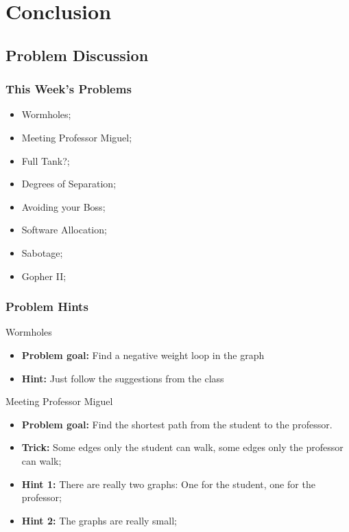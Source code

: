 \section{Conclusion}

\subsection{Problem Discussion}

\begin{frame}
  \frametitle{This Week's Problems}
  \begin{itemize}
  \item Wormholes;
  \item Meeting Professor Miguel;
  \item Full Tank?;
  \item Degrees of Separation;
  \item Avoiding your Boss;
  \item Software Allocation;
  \item Sabotage;
  \item Gopher II;
  \end{itemize}
\end{frame}

\begin{frame}
  \frametitle{Problem Hints}
  \begin{block}{Wormholes}
    \begin{itemize}
    \item {\bf Problem goal:} Find a negative weight loop in the graph
    \item {\bf Hint:} Just follow the suggestions from the class
    \end{itemize}
  \end{block}

  \begin{exampleblock}{Meeting Professor Miguel}
    \begin{itemize}
    \item {\bf Problem goal:} Find the shortest path from the student to the professor.
    \item {\bf Trick:} Some edges only the student can walk, some
      edges only the professor can walk;
    \item {\bf Hint 1:} There are really two graphs: One for the student, one for the
      professor;
    \item {\bf Hint 2:} The graphs are really small;
    \end{itemize}
  \end{exampleblock}
\end{frame}

